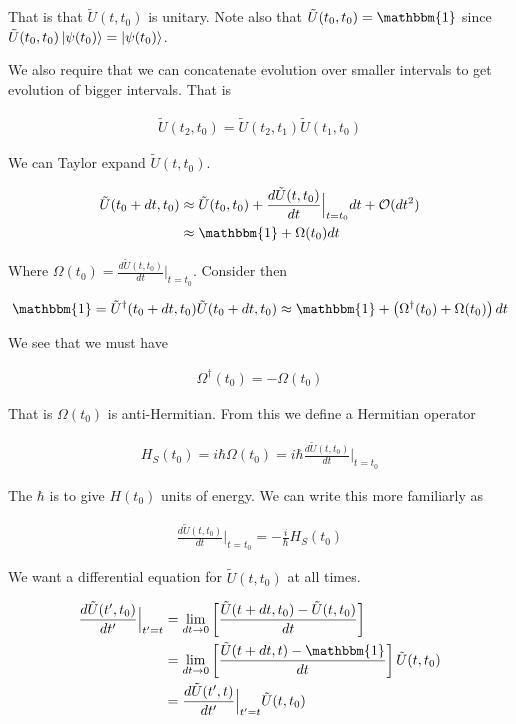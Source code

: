 \documentclass[12pt]{article}
\begin{document}
That is that $\tilde{U}(t,t_0)$ is unitary. Note also that $\tilde{U}(t_0,t_0) = \mathbbm{1}$ since $\tilde{U}(t_0,t_0)\ket{\psi(t_0)} = \ket{\psi(t_0)}$.

We also require that we can concatenate evolution over smaller intervals to get evolution of bigger intervals. That is

\begin{align}
\tilde{U}(t_2,t_0) = \tilde{U}(t_2,t_1)\tilde{U}(t_1,t_0)
\end{align}

We can Taylor expand $\tilde{U}(t,t_0)$.

\begin{align}
\tilde{U}(t_0+dt,t_0) &\approx \tilde{U}(t_0,t_0) + \frac{d \tilde{U}(t,t_0)}{dt} \Bigr\rvert_{t=t_0} dt + \mathcal{O}(dt^2)
\\&\approx \mathbbm{1} + \Omega(t_0) dt
\end{align}

Where $\Omega(t_0) = \frac{d \tilde{U}(t,t_0)}{dt} \Bigr \rvert_{t=t_0}$.
Consider then

\begin{align}
\mathbbm{1} = \tilde{U}^{\dag}(t_0+dt,t_0)\tilde{U}(t_0+dt,t_0) \approx \mathbbm{1} + \left(\Omega^{\dag}(t_0) + \Omega(t_0)\right) dt
\end{align}

We see that we must have

\begin{align}
\Omega^{\dag}(t_0) = -\Omega(t_0)
\end{align}

That is $\Omega(t_0)$ is anti-Hermitian. From this we define a Hermitian operator

\begin{align}
H_S(t_0) = i \hbar \Omega(t_0) = i \hbar \frac{d \tilde{U}(t,t_0)}{dt} \Bigr\rvert_{t=t_0}
\end{align}

The $\hbar$ is to give $H(t_0)$ units of energy. We can write this more familiarly as

\begin{align}
\frac{d \tilde{U}(t,t_0)}{dt} \Bigr \rvert_{t=t_0} = -\frac{i}{\hbar} H_S(t_0)
\end{align}

We want a differential equation for $\tilde{U}(t,t_0)$ at all times.

\begin{align}
\frac{d \tilde{U}(t',t_0)}{d t'}\Bigr \rvert_{t'=t} &= \lim_{dt \rightarrow 0} \left[\frac{\tilde{U}(t+dt,t_0) - \tilde{U}(t,t_0)}{dt} \right]\\
&= \lim_{dt \rightarrow 0} \left[\frac{\tilde{U}(t+dt,t) - \mathbbm{1}}{dt} \right] \tilde{U}(t,t_0)\\
&= \frac{d \tilde{U}(t',t)}{dt'} \Bigr \lvert_{t'=t} \tilde{U}(t,t_0)\\
\end{align}
\end{document}

